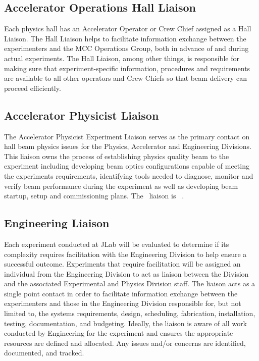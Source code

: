 \documentclass[11pt]{article}
\begin{document}
\subsection{Accelerator Operations Hall Liaison}

Each physics hall has an Accelerator Operator or Crew Chief assigned as a Hall Liaison. 
The Hall Liaison helps to facilitate information exchange between the
experimenters and the MCC Operations Group, both in advance of and during
actual experiments. The Hall Liaison, among other things, is responsible 
for making sure that experiment-specific information, procedures and requirements 
are available to all other operators and Crew Chiefs so that beam delivery can proceed efficiently. 

\subsection{Accelerator Physicist Liaison}

The Accelerator Physicist Experiment Liaison serves as the primary contact on hall beam physics issues 
for the Physics, Accelerator and Engineering Divisions. This liaison owns the process of establishing 
physics quality beam to the experiment including developing beam optics configurations capable of 
meeting the experiments requirements, identifying tools needed to diagnose, monitor and verify 
beam performance during the experiment as well as developing beam startup, setup and commissioning 
plans. The \HALL\ liaison is \AccPhysLiaison\ .


\subsection{Engineering Liaison}

Each experiment conducted at JLab will be evaluated to determine if its complexity requires facilitation 
with the Engineering Division to help ensure a successful outcome.  Experiments that require 
facilitation will be assigned an individual from the Engineering Division to act as liaison 
between the Division and the associated Experimental and Physics Division staff. The liaison 
acts as a single point contact in order to facilitate information exchange 
between the experimenters and those in the Engineering Division responsible for, 
but not limited to, the systems requirements, design, scheduling, fabrication, 
installation, testing, documentation, and budgeting. Ideally, the liaison 
is aware of all work conducted by Engineering for the experiment and ensures 
the appropriate resources are defined and allocated. Any issues and/or concerns are identified, 
documented, and tracked.
\end{document}

